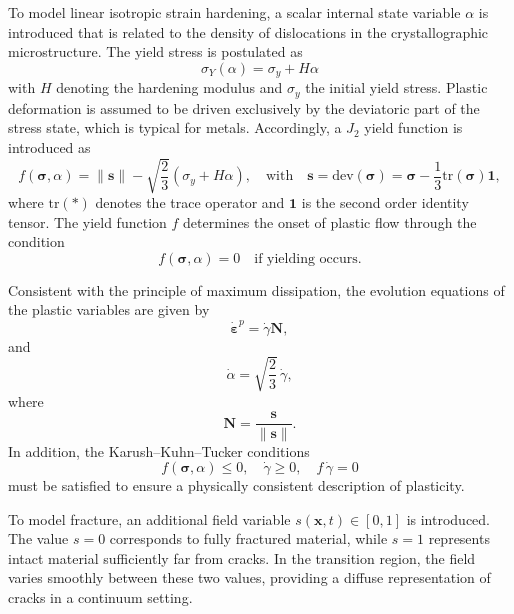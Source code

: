 \documentclass[pdflatex,sn-mathphys-num]{sn-jnl}%
\theoremstyle{thmstyleone}%
\theoremstyle{thmstyletwo}%
\theoremstyle{thmstylethree}%
\begin{document}
To model linear isotropic strain hardening, a scalar internal state variable $\alpha$ is introduced that is related to the density of dislocations in the crystallographic microstructure. 
The yield stress is postulated as
\begin{equation}
    \sigma_Y(\alpha) = \sigma_y + H\alpha
\end{equation}
with $H$ denoting the hardening modulus and $\sigma_y$ the initial yield stress. 
Plastic deformation is assumed to be driven exclusively by the deviatoric part of the stress state, which is typical for metals. 
Accordingly, a $J_2$ yield function is introduced as
\begin{equation}
    f(\boldsymbol{\sigma},\alpha) = \|\boldsymbol{s}\| - \sqrt{\dfrac{2}{3}}\left(\sigma_y+H\alpha\right), 
    \quad \text{with} \quad 
    \boldsymbol{s} = \text{dev}\left(\boldsymbol{\sigma}\right) = \boldsymbol{\sigma}-\dfrac{1}{3}\text{tr}\left(\boldsymbol{\sigma}\right)\boldsymbol{1},
\end{equation}
where $\text{tr}(*)$ denotes the trace operator and $\boldsymbol{1}$ is the second order identity tensor.
The yield function $f$ determines the onset of plastic flow through the condition
\begin{equation}
    f(\boldsymbol{\sigma},\alpha) = 0 \quad \text{if yielding occurs}.
\end{equation}

Consistent with the principle of maximum dissipation, the evolution equations of the plastic variables are given by
\begin{equation}
    \dot{\boldsymbol{\varepsilon}}^p = \dot{\gamma}\boldsymbol{N},
    \label{eq:evolution_eps_p}
\end{equation}
and
\begin{equation}
    \dot{\alpha} = \sqrt{\dfrac{2}{3}}\,\dot{\gamma},
    \label{eq:evolution_alpha}
\end{equation}
where
\begin{equation}
    \boldsymbol{N} = \dfrac{\boldsymbol{s}}{\|\boldsymbol{s}\|}.
\end{equation}
In addition, the Karush--Kuhn--Tucker conditions
\begin{equation}
    f(\boldsymbol{\sigma},\alpha) \le 0, 
    \quad \dot{\gamma} \ge 0, 
    \quad f\,\dot{\gamma} = 0
\end{equation}
must be satisfied to ensure a physically consistent description of plasticity.

To model fracture, an additional field variable $s(\boldsymbol{x},t) \in [0,1]$ is introduced. 
The value $s=0$ corresponds to fully fractured material, while $s=1$ represents intact material sufficiently far from cracks. 
In the transition region, the field varies smoothly between these two values, providing a diffuse representation of cracks in a continuum setting.
\end{document}
